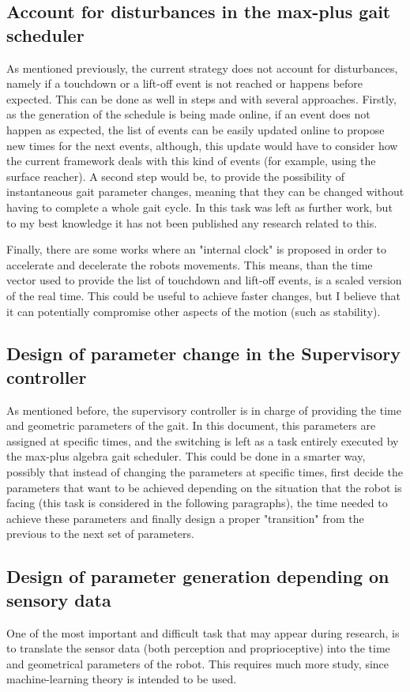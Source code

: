 \documentclass[main.tex]{subfiles}
\begin{document}
\subsection{Account for disturbances in the max-plus gait scheduler}
As mentioned previously, the current strategy does not account for disturbances, namely if a touchdown or a lift-off event is not reached or happens before expected. This can be done as well in steps and with several approaches. Firstly, as the generation of the schedule is being made online, if an event does not happen as expected, the list of events can be easily updated online to propose new times for the next events, although, this update would have to consider how the current framework deals with this kind of events (for example, using the surface reacher). A second step would be, to provide the possibility of instantaneous gait parameter changes, meaning that they can be changed without having to complete a whole gait cycle. In \cite{Lopes2009} this task was left as further work, but to my best knowledge it has not been published any research related to this. 

Finally, there are some works \cite{Lopes2014} where an "internal clock" is proposed in order to accelerate and decelerate the robots movements. This means, than the time vector used to provide the list of touchdown and lift-off events, is a scaled version of the real time. This could be useful to achieve faster changes, but I believe that it can potentially compromise other aspects of the motion (such as stability).

\subsection{Design of parameter change in the Supervisory controller}
As mentioned before, the supervisory controller is in charge of providing the time and geometric parameters of the gait. In this document, this parameters are assigned at specific times, and the switching is left as a task entirely executed by the max-plus algebra gait scheduler. This could be done in a smarter way, possibly that instead of changing the parameters at specific times, first decide the parameters that want to be achieved depending on the situation that the robot is facing (this task is considered in the following paragraphs), the time needed to achieve these parameters and finally design a proper "transition" from the previous to the next set of parameters. 

\subsection{Design of parameter generation depending on sensory data}
One of the most important and difficult task that may appear during research, is to translate the sensor data (both perception and proprioceptive) into the time and geometrical parameters of the robot. This requires much more study, since machine-learning theory is intended to be used.
\end{document}
